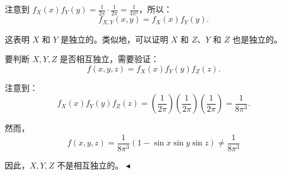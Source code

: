 \documentclass[11pt]{article}
\newenvironment{question}[2][Question]{\begin{trivlist}
\item[\hskip \labelsep {\bfseries #1}\hskip \labelsep {\bfseries #2.}]}{\hfill$\blacktriangleleft$\end{trivlist}}
\begin{document}
\begin{question}{2 (30') (独立性)}
注意到 \(f_X(x) f_Y(y) = \frac{1}{2\pi} \cdot \frac{1}{2\pi} = \frac{1}{4\pi^2}\)，所以：
\[ f_{X,Y}(x,y) = f_X(x) f_Y(y). \]

这表明 \(X\) 和 \(Y\) 是独立的。类似地，可以证明 \(X\) 和 \(Z\)、\(Y\) 和 \(Z\) 也是独立的。


要判断 \(X, Y, Z\) 是否相互独立，需要验证：
\[ f(x, y, z) = f_X(x) f_Y(y) f_Z(z). \]

注意到：
\[ f_X(x) f_Y(y) f_Z(z) = \left(\frac{1}{2\pi}\right) \left(\frac{1}{2\pi}\right) \left(\frac{1}{2\pi}\right) = \frac{1}{8\pi^3}. \]

然而，
\[ f(x, y, z) = \frac{1}{8\pi^3} (1 - \sin{x}\sin{y}\sin{z}) \neq \frac{1}{8\pi^3} \]

因此，\(X, Y, Z\) 不是相互独立的。
    \end{question}
\end{document}
